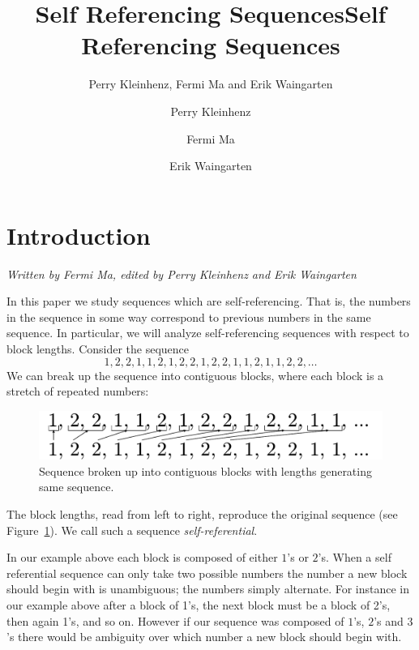 \documentclass[runningheads,a4paper]{llncs}
\title{Self Referencing Sequences}
\author{Perry Kleinhenz, Fermi Ma and Erik Waingarten}
\date{}							%
\begin{document}
\title{Self Referencing Sequences}

\author{Perry Kleinhenz \and Fermi Ma \and Erik Waingarten}
%


\maketitle

\section{Introduction}

\emph{Written by Fermi Ma, edited by Perry Kleinhenz and Erik Waingarten}

In this paper we study sequences which are self-referencing. That is, the numbers in the sequence in some way correspond to previous numbers in the same sequence. In particular, we will analyze self-referencing sequences with respect to block lengths. Consider the sequence
\begin{equation}
\label{eq:onetwo}
1,2,2,1,1,2,1,2,2,1,2,2,1,1,2,1,1,2,2,\dots
\end{equation}
We can break up the sequence into contiguous blocks, where each block is a stretch of repeated numbers:
\begin{figure}
\label{fig:sequenceblocks}
\center
\includegraphics[width=0.4\linewidth]{sequenceBlocks}
\caption{Sequence broken up into contiguous blocks with lengths generating same sequence.}
\end{figure}

The block lengths, read from left to right, reproduce the original sequence (see Figure~\ref{fig:sequenceblocks}). We call such a sequence \emph{self-referential}. 

In our example above each block is composed of either $1$'s or $2$'s. When a self referential sequence can only take two possible numbers the number a new block should begin with is unambiguous; the numbers simply alternate. For instance in our example above after a block of 1's, the next block must be a block of 2's, then again 1's, and so on. However if our sequence was composed of $1$'s, $2$'s and $3$'s there would be ambiguity over which number a new block should begin with. 
\end{document}
